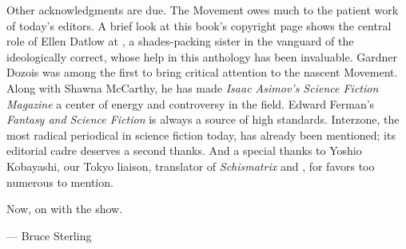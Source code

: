 Other acknowledgments are due. The Movement owes much to the patient work of today's editors. A brief look at this book's copyright page shows the central role of Ellen Datlow at , a shades-packing sister in the vanguard of the ideologically correct, whose help in this anthology has been invaluable. Gardner Dozois was among the first to bring critical attention to the nascent Movement. Along with Shawna McCarthy, he has made \textit{Isaac Asimov's Science Fiction Magazine} a center of energy and controversy in the field. Edward Ferman's \textit{Fantasy and Science Fiction} is always a source of high standards. Interzone, the most radical periodical in science fiction today, has already been mentioned; its editorial cadre deserves a second thanks. And a special thanks to Yoshio Kobayashi, our Tokyo liaison, translator of \textit{Schismatrix} and , for favors too numerous to mention.

Now, on with the show.

--- Bruce Sterling
